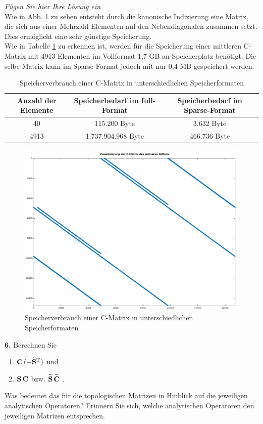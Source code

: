 \documentclass[Protokollheft.tex]{subfiles}
\begin{document}
\emph{Fügen Sie hier Ihre Lösung ein}\\

 Wie in Abb. \ref{fig:visucmatrixprimgitt} zu sehen entsteht durch die kanonische Indizierung eine Matrix, die sich aus einer Mehrzahl Elementen auf den Nebendiagonalen zusammen setzt. Dies ermöglicht eine sehr günstige Speicherung. \\
 Wie in Tabelle \ref{tbl:speicherCMatrix} zu erkennen ist, werden für die Speicherung einer mittleren C-Matrix mit 4913 Elementen im Vollformat 1,7 GB an Speicherplatz benötigt. Die selbe Matrix kann im Sparse-Format jedoch mit nur 0,4 MB gespeichert werden. 
 \begin{table}
	
 \begin{tabular}{|c|c|c|}
 
 	\hline 
 	Anzahl der Elemente& Speicherbedarf im full-Format &  Speicherbedarf im Sparse-Format\\ 
 	\hline 
 	40& 115.200 Byte & 3.632 Byte \\ 
 	\hline 
 	4913& 1.737.904.968 Byte& 466.736 Byte \\ 
 	\hline 	
 \end{tabular} 	
\label{tbl:speicherCMatrix}
\caption{Speicherverbrauch einer C-Matrix in unterschiedlichen Speicherformaten}
  \end{table}
\begin{figure}
	\centering
	\includegraphics[width=0.7\linewidth]{versuch2/VisuCMatrixPrimGitt}
	\caption{Speicherverbrauch einer C-Matrix in unterschiedlichen Speicherformaten}
	\label{fig:visucmatrixprimgitt}
\end{figure}


        \begin{framed}
	\noindent \textbf{6.} Berechnen Sie
                    \begin{enumerate}
                        \item $\mathbf{C}\, (-\widetilde{\mathbf{S}}^{\text{T}})$ und
                        \item $\mathbf{S}\, \mathbf{C}$ bzw. $\widetilde{\mathbf{S}}\, \widetilde{\mathbf{C}}$ \; .
                    \end{enumerate}
                    Was bedeutet das für die topologischen Matrizen in Hinblick
                    auf die jeweiligen analytischen Operatoren? Erinnern Sie sich, welche analytischen Operatoren den jeweiligen Matrizen entsprechen.\label{exer:CG_SC}
\end{framed}
\end{document}
